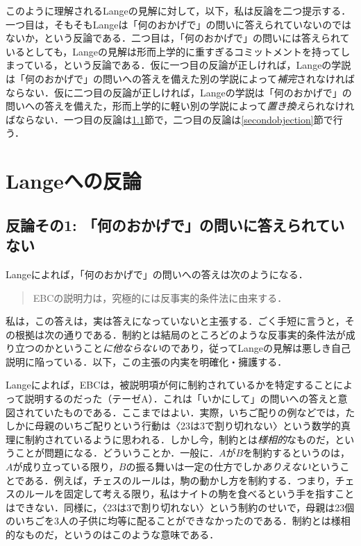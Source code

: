 \documentclass[dvipdfmx,twoside,11pt,uplatex]{jsarticle}
\theoremstyle{definition}
\begin{document}
このように理解されるLangeの見解に対して，以下，私は反論を二つ提示する．一つ目は，そもそもLangeは「何のおかげで」の問いに答えられていないのではないか，という反論である．二つ目は，「何のおかげで」の問いには答えられているとしても，Langeの見解は形而上学的に重すぎるコミットメントを持ってしまっている，という反論である．仮に一つ目の反論が正しければ，Langeの学説は「何のおかげで」の問いへの答えを備えた別の学説によって\emph{補完}されなければならない．仮に二つ目の反論が正しければ，Langeの学説は「何のおかげで」の問いへの答えを備えた，形而上学的に軽い別の学説によって\emph{置き換え}られなければならない．一つ目の反論は\ref{firstobjection}節で，二つ目の反論は\ref{secondobjection}節で行う．

\section{Langeへの反論}

\subsection{反論その1: 「何のおかげで」の問いに答えられていない}\label{firstobjection}

Langeによれば，「何のおかげで」の問いへの答えは次のようになる．
\begin{quote}
    EBCの説明力は，究極的には反事実的条件法に由来する．
\end{quote}
私は，この答えは，実は答えになっていないと主張する．ごく手短に言うと，その根拠は次の通りである．制約とは結局のところどのような反事実的条件法が成り立つのかということ\emph{に他ならない}のであり，従ってLangeの見解は悪しき自己説明に陥っている．以下，この主張の内実を明確化・擁護する．

Langeによれば，EBCは，被説明項が何に制約されているかを特定することによって説明するのだった（テーゼA）．これは「いかにして」の問いへの答えと意図されていたものである．ここまではよい．実際，いちご配りの例などでは，たしかに母親のいちご配りという行動は〈23は3で割り切れない〉という数学的真理に制約されているように思われる．しかし今，制約とは\emph{様相的}なものだ，ということが問題になる．どういうことか．一般に．$A$が$B$を制約するというのは，$A$が成り立っている限り，$B$の振る舞いは一定の仕方でしか\emph{ありえない}ということである．例えば，チェスのルールは，駒の動かし方を制約する．つまり，チェスのルールを固定して考える限り，私はナイトの駒を食べるという手を指すことはできない．同様に，〈23は3で割り切れない〉という制約のせいで，母親は23個のいちごを3人の子供に均等に配ることができなかったのである．制約とは様相的なものだ，というのはこのような意味である．
\end{document}
